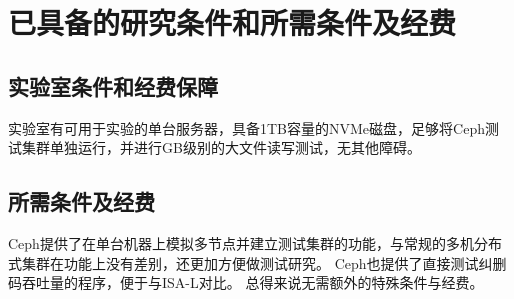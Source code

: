 
\chapter{已具备的研究条件和所需条件及经费}

\section{实验室条件和经费保障}

实验室有可用于实验的单台服务器，具备1TB容量的NVMe磁盘，足够将Ceph测试集群单独运行，并进行GB级别的大文件读写测试，无其他障碍。

\section{所需条件及经费}

Ceph提供了在单台机器上模拟多节点并建立测试集群的功能，与常规的多机分布式集群在功能上没有差别，还更加方便做测试研究。
Ceph也提供了直接测试纠删码吞吐量的程序，便于与ISA-L对比。
总得来说无需额外的特殊条件与经费。